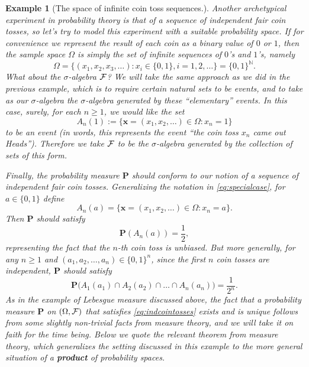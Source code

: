 \documentclass[12pt]{article}
\newcommand{\prob}{\mathbf{P}}
\theoremstyle{example}
\newtheorem{example}[thm]{Example}
\begin{document}
\begin{example}[The space of infinite coin toss sequences.] Another archetypical experiment in probability theory is that of a sequence of independent fair coin tosses, so let's try to model this experiment with a suitable probability space. If for convenience we represent the result of each coin as a binary value of $0$ or $1$, then the sample space $\Omega$ is simply the set of infinite sequences of $0$'s and $1$'s, namely
$$ \Omega = \big\{ (x_1, x_2, x_3, \ldots) : x_i \in \{0,1\}, i=1,2,\ldots \big\}
= \{ 0,1 \}^{\mathbb{N}}. $$
What about the $\sigma$-algebra ${\cal F}$? We will take the same approach as we did in the previous example, which is to require certain natural sets to be events, and to take as our $\sigma$-algebra the $\sigma$-algebra generated by these ``elementary'' events. In this case, surely, for each $n\ge 1$, we would like the set
\begin{equation}
A_n(1) := \{ \mathbf{x}=(x_1,x_2,\ldots) \in \Omega : x_n = 1 \}
\label{eq:specialcase}
\end{equation}
to be an event (in words, this represents the event ``the coin toss $x_n$ came out Heads''). Therefore we take ${\cal F}$ to be the $\sigma$-algebra generated by the collection of sets of this form.

Finally, the probability measure $\prob$ should conform to our notion of a sequence of independent fair coin tosses. Generalizing the notation in \eqref{eq:specialcase}, for $a\in\{0,1\}$ define
$$A_n(a) = \{ \mathbf{x}=(x_1,x_2,\ldots) \in \Omega : x_n = a \}.$$
Then $\prob$ should satisfy 
$$ \prob(A_n(a)) = \frac12, $$
representing the fact that the $n$-th coin toss is unbiased. But more generally, for any $n\ge 1$ and $(a_1,a_2,\ldots,a_n) \in \{0,1\}^n$, since the first $n$ coin tosses are independent, $\prob$ should satisfy
\begin{equation}
\prob\big(A_1(a_1) \cap A_2(a_2) \cap \ldots \cap A_n(a_n)\big) = \frac{1}{2^n}.
\label{eq:indcointosses}
\end{equation}
As in the example of Lebesgue measure discussed above, the fact that a probability measure $\prob$  on $(\Omega, {\cal F})$ that satisfies \eqref{eq:indcointosses} exists and is unique follows from some slightly non-trivial facts from measure theory, and we will take it on faith for the time being. Below we quote the relevant theorem from measure theory, which generalizes the setting discussed in this example to the more general situation of a \textbf{product} of probability spaces.
\end{example}
\end{document}
